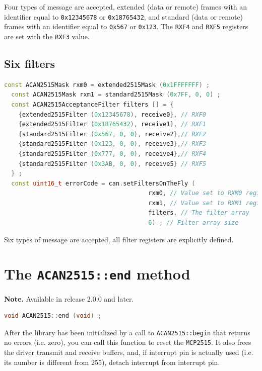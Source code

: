 \documentclass[10pt, a4paper, obeyspaces]{extarticle}
\newcommand \sectionLabel[2]{\section{#1}\label{sec:#2}}
\begin{document}
Four types of message are accepted, extended (data or remote) frames with an identifier equal to \texttt{0x12345678} or \texttt{0x18765432}, and standard (data or remote) frames with an identifier equal to \texttt{0x567} or \texttt{0x123}. The \texttt{RXF4} and \texttt{RXF5} registers are set with the \texttt{RXF3} value.








\subsection{Six filters}
{ \small\begin{lstlisting}[language=c++]
  const ACAN2515Mask rxm0 = extended2515Mask (0x1FFFFFFF) ;
  const ACAN2515Mask rxm1 = standard2515Mask (0x7FF, 0, 0) ;
  const ACAN2515AcceptanceFilter filters [] = {
    {extended2515Filter (0x12345678), receive0}, // RXF0
    {extended2515Filter (0x18765432), receive1}, // RXF1
    {standard2515Filter (0x567, 0, 0), receive2},// RXF2
    {standard2515Filter (0x123, 0, 0), receive3},// RXF3
    {standard2515Filter (0x777, 0, 0), receive4},// RXF4
    {standard2515Filter (0x3AB, 0, 0), receive5} // RXF5
  } ;
  const uint16_t errorCode = can.setFiltersOnTheFly (
                                        rxm0, // Value set to RXM0 register
                                        rxm1, // Value set to RXM1 register
                                        filters, // The filter array
                                        6) ; // Filter array size
\end{lstlisting}}

Six types of message are accepted, all filter registers are explicitly defined.














\sectionLabel{The \texttt{ACAN2515::end} method}{endFunction}

{\bf Note. } Available in release 2.0.0 and later.

{ \small\begin{lstlisting}[language=c++]
void ACAN2515::end (void) ;
\end{lstlisting}}

After the library has been initialized by a call to \texttt{ACAN2515::begin} that returns no errors (i.e. zero), you can call this function to reset the \texttt{MCP2515}. It also frees the driver transmit and receive buffers, and, if interrupt pin is actually used (i.e. its number is different from 255), detach interrupt from interrupt pin.
\end{document}
